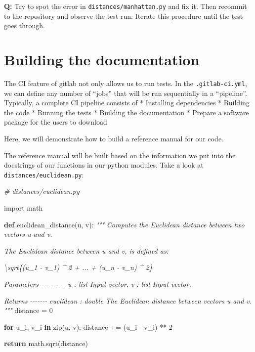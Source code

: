 \documentclass[11pt]{article}
\newenvironment{Shaded}{}{}
\newcommand{\KeywordTok}[1]{\textcolor[rgb]{0.00,0.44,0.13}{\textbf{{#1}}}}
\newcommand{\DecValTok}[1]{\textcolor[rgb]{0.25,0.63,0.44}{{#1}}}
\newcommand{\CommentTok}[1]{\textcolor[rgb]{0.38,0.63,0.69}{\textit{{#1}}}}
\newcommand{\NormalTok}[1]{{#1}}
\newcommand{\ImportTok}[1]{{#1}}
\newcommand{\ControlFlowTok}[1]{\textcolor[rgb]{0.00,0.44,0.13}{\textbf{{#1}}}}
\newcommand{\OperatorTok}[1]{\textcolor[rgb]{0.40,0.40,0.40}{{#1}}}
\newcommand{\BuiltInTok}[1]{{#1}}
\begin{document}
    \textbf{Q:} Try to spot the error in \texttt{distances/manhattan.py} and
fix it. Then recommit to the repository and observe the test run.
Iterate this procedure until the test goes through.

    \hypertarget{building-the-documentation}{%
\section{Building the documentation}\label{building-the-documentation}}

The CI feature of gitlab not only allows us to run tests. In the
\texttt{.gitlab-ci.yml}, we can define any number of ``jobs'' that will
be run sequentially in a ``pipeline''. Typically, a complete CI pipeline
consists of * Installing dependencies * Building the code * Running the
tests * Building the documentation * Prepare a software package for the
users to download

    Here, we will demonstrate how to build a reference manual for our code.

The reference manual will be built based on the information we put into
the docstrings of our functions in our python modules. Take a look at
\texttt{distances/euclidean.py}:

\begin{Shaded}
\begin{Highlighting}[]
\CommentTok{\# distances/euclidean.py}

\ImportTok{import}\NormalTok{ math }

\KeywordTok{def}\NormalTok{ euclidean\_distance(u, v):}
    \CommentTok{"""}
\CommentTok{    Computes the Euclidean distance between two vectors \textasciigrave{}u\textasciigrave{} and \textasciigrave{}v\textasciigrave{}.}

\CommentTok{    The Euclidean distance between \textasciigrave{}u\textasciigrave{} and \textasciigrave{}v\textasciigrave{}, is defined as:}

\CommentTok{    \textbackslash{}sqrt\{(u\_1 {-} v\_1) \^{} 2 + ... + (u\_n {-} v\_n) \^{} 2\}}

\CommentTok{    Parameters}
\CommentTok{    {-}{-}{-}{-}{-}{-}{-}{-}{-}{-}}
\CommentTok{    u : list}
\CommentTok{        Input vector.}
\CommentTok{    v : list}
\CommentTok{        Input vector.}

\CommentTok{    Returns}
\CommentTok{    {-}{-}{-}{-}{-}{-}{-}}
\CommentTok{    euclidean : double}
\CommentTok{        The Euclidean distance between vectors \textasciigrave{}u\textasciigrave{} and \textasciigrave{}v\textasciigrave{}.}
\CommentTok{    """}
\NormalTok{    distance }\OperatorTok{=} \DecValTok{0}

    \ControlFlowTok{for}\NormalTok{ u\_i, v\_i }\KeywordTok{in} \BuiltInTok{zip}\NormalTok{(u, v):}
\NormalTok{        distance }\OperatorTok{+=}\NormalTok{ (u\_i }\OperatorTok{{-}}\NormalTok{ v\_i) }\OperatorTok{**} \DecValTok{2}

    \ControlFlowTok{return}\NormalTok{ math.sqrt(distance)}

\end{Highlighting}
\end{Shaded}
\end{document}
